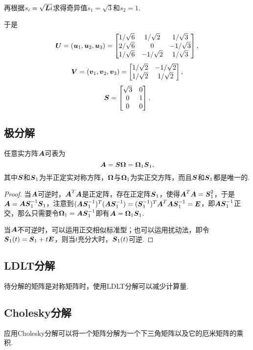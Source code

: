 \begin{example}
\begin{solution}
再根据\(s_i = \sqrt{\boldsymbol{L}{i}}\)求得奇异值\(s_1 = \sqrt{3}\)和\(s_2 = 1\).

于是\[
\boldsymbol{U} = (\boldsymbol{u}_1,\boldsymbol{u}_2,\boldsymbol{u}_3) = \begin{bmatrix}
1/\sqrt{6} & 1/\sqrt{2} & 1/\sqrt{3} \\
2/\sqrt{6} & 0 & -1/\sqrt{3} \\
1/\sqrt{6} & -1/\sqrt{2} & 1/\sqrt{3}
\end{bmatrix},
\]\[
\boldsymbol{V} = (\boldsymbol{v}_1,\boldsymbol{v}_2,\boldsymbol{v}_3) = \begin{bmatrix}
1/\sqrt{2} & -1/\sqrt{2} \\
1/\sqrt{2} & 1/\sqrt{2}
\end{bmatrix},
\]\[
\S = \begin{bmatrix}
\sqrt{3} & 0 \\
0 & 1 \\
0 & 0
\end{bmatrix}.
\]
\end{solution}
\end{example}

\subsection{极分解}
\begin{theorem}
\def\S{\mat{S}}
\def\M{\mat{\Omega}}
任意实方阵\(\boldsymbol{A}\)可表为\[
\A = \S\M = \M_1 \S_1,
\]其中\(\S\)和\(\S_1\)为半正定实对称方阵，\(\M\)与\(\M_1\)为实正交方阵，而且\(\S\)和\(\S_1\)都是唯一的.
\begin{proof}
当\(\boldsymbol{A}\)可逆时，\(\boldsymbol{A}^T \boldsymbol{A}\)是正定阵，存在正定阵\(\S_1\)，使得\(\A^T \A = \S_1^2\)，于是\(\A = \A \S_1^{-1} \S_1\)，注意到\((\A \S_1^{-1})^T (\A \S_1^{-1}) = (\S_1^{-1})^T \A^T \A \S_1^{-1} = \E\)，即\(\A \S_1^{-1}\)正交，那么只需要令\(\M_1 = \A \S_1^{-1}\)即有\(\A = \M_1 \S_1\).

当\(\boldsymbol{A}\)不可逆时，可以运用正交相似标准型；也可以运用扰动法，即令\(\S_1(t) = \S_1 + t\E\)，则当\(t\)充分大时，\(\S_1(t)\)可逆.
\end{proof}
\end{theorem}

\subsection{LDLT分解}
待分解的矩阵是对称矩阵时，使用LDLT分解可以减少计算量.

\subsection{Cholesky分解}
应用Cholesky分解可以将一个矩阵分解为一个下三角矩阵以及它的厄米矩阵的乘积.
